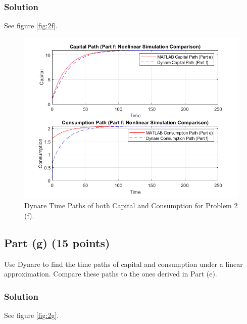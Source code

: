 \documentclass[12pt]{article}
\begin{document}
\subsubsection*{Solution}
See figure \eqref{fig:2f}.

\begin{figure}[H]
    \centering
        \includegraphics[width=\textwidth]{pset3_2f.png}
        \caption{Dynare Time Paths of both Capital and Consumption for Problem 2 (f).}
        \label{fig:2f}
\end{figure}

\subsection*{Part (g) (15 points)}
Use Dynare to find the time paths of capital and consumption under a linear approximation. Compare these paths to the ones derived in Part (e).
\subsubsection*{Solution}
See figure \eqref{fig:2g}.
\end{document}
